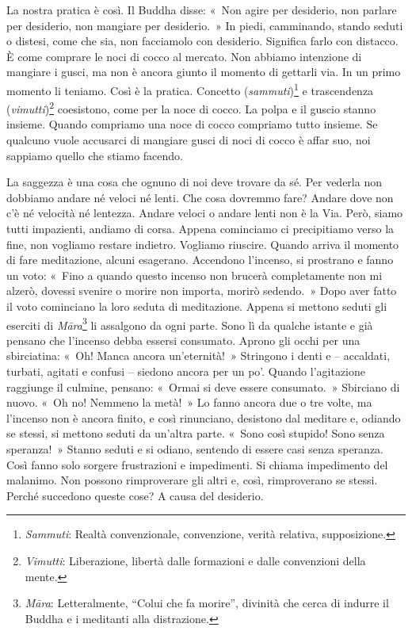 La nostra pratica è così. Il Buddha disse: «~Non agire per desiderio,
non parlare per desiderio, non mangiare per desiderio.~» In piedi,
camminando, stando seduti o distesi, come che sia, non facciamolo con
desiderio. Significa farlo con distacco. È come comprare le noci di
cocco al mercato. Non abbiamo intenzione di mangiare i gusci, ma non è
ancora giunto il momento di gettarli via. In un primo momento li
teniamo. Così è la pratica. Concetto (\emph{sammuti})\footnote{\emph{Sammuti}:
  Realtà convenzionale, convenzione, verità relativa, supposizione.} e
trascendenza (\emph{vimutti})\footnote{\emph{Vimutti}: Liberazione,
  libertà dalle formazioni e dalle convenzioni della mente.} coesistono,
come per la noce di cocco. La polpa e il guscio stanno insieme. Quando
compriamo una noce di cocco compriamo tutto insieme. Se qualcuno vuole
accusarci di mangiare gusci di noci di cocco è affar suo, noi sappiamo
quello che stiamo facendo.

La saggezza è una cosa che ognuno di noi deve trovare da sé. Per vederla
non dobbiamo andare né veloci né lenti. Che cosa dovremmo fare? Andare
dove non c'è né velocità né lentezza. Andare veloci o andare lenti non è
la Via. Però, siamo tutti impazienti, andiamo di corsa. Appena
cominciamo ci precipitiamo verso la fine, non vogliamo restare indietro.
Vogliamo riuscire. Quando arriva il momento di fare meditazione, alcuni
esagerano. Accendono l'incenso, si prostrano e fanno un voto: «~Fino a
quando questo incenso non brucerà completamente non mi alzerò, dovessi
svenire o morire non importa, morirò sedendo.~» Dopo aver fatto il voto
cominciano la loro seduta di meditazione. Appena si mettono seduti gli
eserciti di \emph{Māra}\footnote{\emph{Māra}: Letteralmente, ``Colui che
  fa morire'', divinità che cerca di indurre il Buddha e i meditanti
  alla distrazione.} li assalgono da ogni parte. Sono lì da qualche
istante e già pensano che l'incenso debba essersi consumato. Aprono gli
occhi per una sbirciatina: «~Oh! Manca ancora un'eternità!~» Stringono i
denti e -- accaldati, turbati, agitati e confusi -- siedono ancora per
un po'. Quando l'agitazione raggiunge il culmine, pensano: «~Ormai si
deve essere consumato.~» Sbirciano di nuovo. «~Oh no! Nemmeno la metà!~»
Lo fanno ancora due o tre volte, ma l'incenso non è ancora finito, e
così rinunciano, desistono dal meditare e, odiando se stessi, si mettono
seduti da un'altra parte. «~Sono così stupido! Sono senza speranza!~»
Stanno seduti e si odiano, sentendo di essere casi senza speranza. Così
fanno solo sorgere frustrazioni e impedimenti. Si chiama impedimento del
malanimo. Non possono rimproverare gli altri e, così, rimproverano se
stessi. Perché succedono queste cose? A causa del desiderio.

